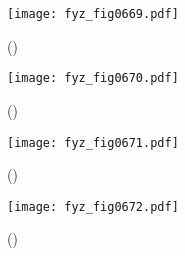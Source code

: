     \begin{figure}[ht!] %
      \centering
      \texttt{[image: fyz\_fig0669.pdf]}
      \caption{
               (\cite[s.~707]{Feynman02})}
      \label{fyz:fig0669}
    \end{figure}

    \begin{figure}[ht!] %
      \centering
      \texttt{[image: fyz\_fig0670.pdf]}
      \caption{
               (\cite[s.~707]{Feynman02})}
      \label{fyz:fig0670}
    \end{figure}


    \begin{figure}[ht!] %
      \centering
      \texttt{[image: fyz\_fig0671.pdf]}
      \caption{
               (\cite[s.~707]{Feynman02})}
      \label{fyz:fig0671}
    \end{figure}

    \begin{figure}[ht!] %
      \centering
      \texttt{[image: fyz\_fig0672.pdf]}
      \caption{
               (\cite[s.~707]{Feynman02})}
      \label{fyz:fig0672}
    \end{figure}


